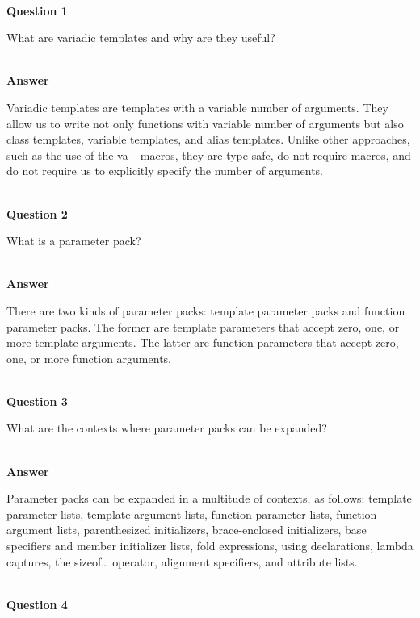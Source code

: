 \hspace*{\fill} \\ %
\noindent
\textbf{Question 1}

What are variadic templates and why are they useful?

\hspace*{\fill} \\ %
\noindent
\textbf{Answer}

Variadic templates are templates with a variable number of arguments. They allow us to write not only functions with variable number of arguments but also class templates, variable templates, and alias templates. Unlike other approaches, such as the use of the va\_ macros, they are type-safe, do not require macros, and do not require us to explicitly specify the number of arguments.


\hspace*{\fill} \\ %
\noindent
\textbf{Question 2}

What is a parameter pack?

\hspace*{\fill} \\ %
\noindent
\textbf{Answer}

There are two kinds of parameter packs: template parameter packs and function parameter packs. The former are template parameters that accept zero, one, or more template arguments. The latter are function parameters that accept zero, one, or more function arguments.

\hspace*{\fill} \\ %
\noindent
\textbf{Question 3}

What are the contexts where parameter packs can be expanded?

\hspace*{\fill} \\ %
\noindent
\textbf{Answer}

Parameter packs can be expanded in a multitude of contexts, as follows: template parameter lists, template argument lists, function parameter lists, function argument lists, parenthesized initializers, brace-enclosed initializers, base specifiers and member initializer lists, fold expressions, using declarations, lambda captures, the sizeof… operator, alignment specifiers, and attribute lists.

\hspace*{\fill} \\ %
\noindent
\textbf{Question 4}

